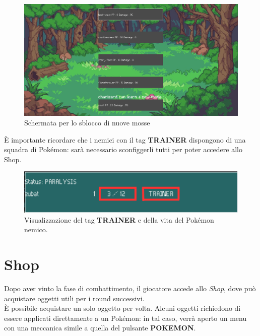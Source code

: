\documentclass[a4paper,12pt]{report}
\begin{document}
{{\begin{figure}[H]
  \centering
  \includegraphics[width=\textwidth]{immagini/NewMoveToLearn.png}
  \caption{Schermata per lo sblocco di nuove mosse}
  \label{fig:save_screen}
\end{figure}
\noindent
È importante ricordare che i nemici con il tag \textbf{TRAINER} dispongono di una squadra di Pokémon: sarà necessario sconfiggerli tutti per poter accedere allo Shop.

\begin{figure}[H]
  \centering
  \includegraphics[width=\textwidth]{immagini/Trainer.png}
  \caption{Visualizzazione del tag \textbf{TRAINER} e della vita del Pokémon nemico.}
  \label{fig:trainer_tag}
\end{figure}

\section{Shop}

Dopo aver vinto la fase di combattimento, il giocatore accede allo \textit{Shop}, dove può acquistare oggetti utili per i round successivi.\\
È possibile acquistare un solo oggetto per volta. Alcuni oggetti richiedono di essere applicati direttamente a un Pokémon: in tal caso, verrà aperto un menu con una meccanica simile a quella del pulsante \textbf{POKEMON}.

}}
\end{document}
